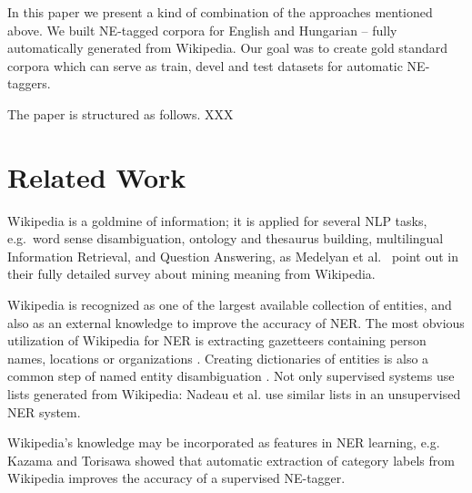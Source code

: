 \documentclass[11pt]{article}
\begin{document}


In this paper we present a kind of combination of the approaches mentioned above. We built NE-tagged corpora for English and Hungarian -- fully automatically generated from Wikipedia. Our goal was to create gold standard corpora which can serve as train, devel and test datasets for automatic NE-taggers. 

The paper is structured as follows. XXX


\section{Related Work}

Wikipedia is a goldmine of information; it is applied for several NLP tasks, e.g.~word sense disambiguation, ontology and thesaurus building, multilingual Information Retrieval, and Question Answering, as Medelyan et al.~ point out in their fully detailed survey about mining meaning from Wikipedia. 

Wikipedia is recognized as one of the largest available collection of entities, and also as an external knowledge to improve the accuracy of NER. The most obvious utilization of Wikipedia for NER is extracting gazetteers containing person names, locations or organizations \cite{Toral:06}. Creating dictionaries of entities is also a common step of named entity disambiguation \cite{Bunescu:06,Cucerzan:07}. Not only supervised systems use lists generated from Wikipedia: Nadeau et al.  use similar lists in an unsupervised NER system. 

Wikipedia's knowledge may be incorporated as features in NER learning, e.g. Kazama and Torisawa  showed that automatic extraction of category labels from Wikipedia improves the accuracy of a supervised NE-tagger. 
\end{document}
